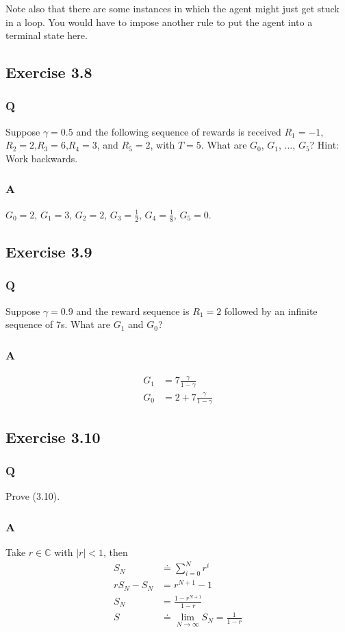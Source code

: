 Note also that there are some instances in which the agent might just get stuck in a loop. You would have to impose another rule to put the agent into a terminal state here.

\subsection{Exercise 3.8}
\subsubsection{Q}
Suppose $\gamma = 0.5$ and the following sequence of rewards is received $R_1=-1$, $R_2 =2$,$R_3 =6$,$R_4 =3$, and $R_5 =2$, with $T =5$. What are $G_0$, $G_1$, $\dots$, $G_5$? Hint: Work backwards.

\subsubsection{A}
$G_0 = 2$, $G_1 = 3$, $G_2 = 2$, $G_3 = \frac12$, $G_4 = \frac18$, $G_5=0$.

\subsection{Exercise 3.9}
\subsubsection{Q}
Suppose $\gamma = 0.9$ and the reward sequence is $R_1 = 2$ followed by an infinite sequence of $7$s. What are $G_1$ and $G_0$?
\subsubsection{A}
\begin{align}
    G_1 &= 7 \frac{\gamma}{1 - \gamma} \\
    G_0 &= 2 + 7 \frac{\gamma}{1 - \gamma}
\end{align}


\subsection{Exercise 3.10}
\subsubsection{Q}
Prove (3.10).

\subsubsection{A}
Take $r \in \mathbb{C}$ with $|r| < 1$, then
\begin{align*}
    S_N &\doteq \sum_{i=0}^N r^i \\
    rS_N - S_N &= r^{N+1} - 1 \\
    S_N &= \frac{1 - r^{N+1}}{1 - r} \\
    S &\doteq \lim_{N \to \infty} S_N = \frac{1}{1 - r}
\end{align*}

